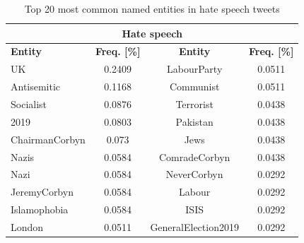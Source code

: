 \documentclass[conference]{IEEEtran}
\begin{document}
\begin{table}[!ht]
  \def\arraystretch{1.0}%
  \begin{center}
    \caption{Top 20 most common named entities in hate speech tweets}
    \label{tab:named_entities_hate}
    \begin{tabular}{l c | c c}
      \hline\hline
      \multicolumn{4}{c}{\textbf{Hate speech}}\\
      \hline
      \textbf{Entity}&\textbf{Freq. [\%]}&\textbf{Entity}&\textbf{Freq. [\%]}\\
      \hline
      UK & 0.2409 & LabourParty & 0.0511\\
      Antisemitic & 0.1168 & Communist & 0.0511\\
      Socialist & 0.0876 & Terrorist & 0.0438\\
      2019 & 0.0803 & Pakistan & 0.0438\\
      ChairmanCorbyn & 0.073 & Jews & 0.0438\\
      Nazis & 0.0584 & ComradeCorbyn & 0.0438\\
      Nazi & 0.0584 & NeverCorbyn & 0.0292\\
      JeremyCorbyn & 0.0584 & Labour & 0.0292\\
      Islamophobia & 0.0584 & ISIS & 0.0292\\
      London & 0.0511 & GeneralElection2019 & 0.0292\\                        
      \hline\hline
    \end{tabular}  
  \end{center}
\end{table}
\end{document}
